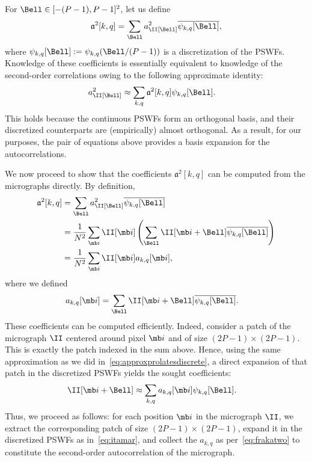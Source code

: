 \documentclass[9pt,twocolumn,twoside,lineno]{pnas-new}
\begin{document}
For $\Bell \in [-(P-1), P-1]^2$, let us define 
\begin{equation} \label{eq:PSWF_expansion}
\mathfrak{a}^2[k, q]  =
\sum_{\Bell}a^2_\II[\Bell]\overline{\psi_{k,q}[\Bell]}, 
\end{equation}
where $\psi_{k,q}[\Bell] := \psi_{k,q}(\Bell/(P-1))$ is a discretization of the PSWFs. 
Knowledge of these coefficients is essentially equivalent to knowledge of the second-order correlations owing to the following approximate identity:
\begin{align}
a^2_\II[\Bell] & \approx \sum_{k,q}\mathfrak{a}^2[k,q]\psi_{k,q}[\Bell].
\label{eq:approxprolatesdiscrete}
\end{align}
This holds because the continuous PSWFs form an orthogonal basis, and their discretized counterparts are (empirically) almost orthogonal. As a result, for our purposes, the pair of equations above provides a basis expansion for the autocorrelations.

We now proceed to show that the coefficients $\mathfrak{a}^2[k, q]$ can be computed from the micrographs directly.
By definition,
\begin{align}
\mathfrak{a}^2[k,q] & =\sum_{\Bell} a^2_\II[\Bell] \overline{\psi_{k,q}[\Bell]} \nonumber\\
& = \frac{1}{N^2}\sum_{\mb i}\II[\mb i]\left(\sum_{\Bell}\II[\mb i+\Bell]\overline{\psi_{k,q}[\Bell]}\right) \nonumber \\
& = \frac{1}{N^2}\sum_{\mb i}\II[\mb i] a_{k,q}[\mb i], \label{eq:frakatwo}
\end{align}
where we defined
\begin{align}
a_{k,q}[\mb i] & = \sum_{\Bell}\II[\mb i+\Bell]\overline{\psi_{k,q}[\Bell]}.
\label{eq:patchcoefficients}
\end{align}
These coefficients can be computed efficiently. Indeed, consider a patch of the micrograph $\II$ centered around pixel $\mb i$ and of size $(2P-1) \times (2P-1)$. This is exactly the patch indexed in the sum above. Hence, using the same approximation as we did in~\eqref{eq:approxprolatesdiscrete}, a direct expansion of that patch in the discretized PSWFs yields the sought coefficients:
\begin{align}
\II[\mb i+\Bell] & \approx \sum_{k,q} a_{k,q}[\mb i] \psi_{k,q}[\Bell]. \label{eq:itamar}
\end{align}
Thus, we proceed as follows:
for each position $\mb i$ in the micrograph $\II$, we extract the corresponding patch of size $(2P-1) \times (2P-1)$, expand it in the discretized PSWFs as in~\eqref{eq:itamar}, and collect the $a_{k,q}$ as per~\eqref{eq:frakatwo} to constitute the second-order autocorrelation of the micrograph.
\end{document}
